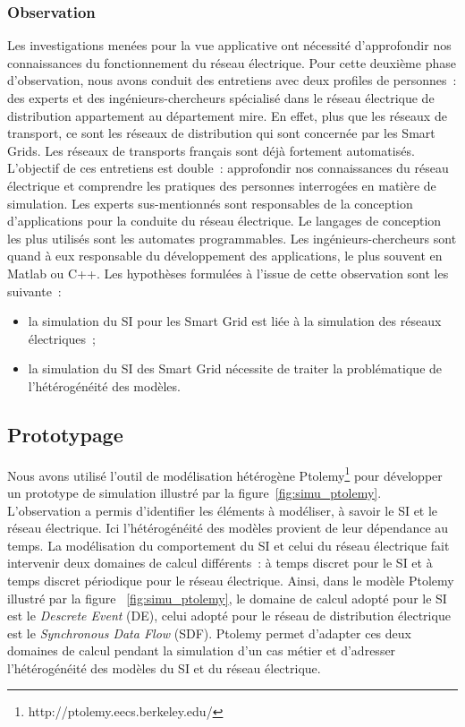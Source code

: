 				\subsubsection{Observation}
				Les investigations menées pour la vue applicative ont nécessité d'approfondir nos connaissances du fonctionnement du réseau électrique. Pour cette deuxième phase d'observation, nous avons conduit des entretiens avec deux profiles de personnes~: des experts et des ingénieurs-chercheurs spécialisé dans le réseau électrique de distribution  appartement au département \gls{mire}. En effet, plus que les réseaux de transport, ce sont les réseaux de distribution qui sont concernée par les Smart Grids. Les réseaux de transports français sont déjà fortement automatisés. 
				L'objectif de ces entretiens est double~: approfondir nos connaissances du réseau électrique et comprendre les pratiques des personnes interrogées en matière de simulation.
				Les experts sus-mentionnés sont responsables de la conception d'applications pour la conduite du réseau électrique. Le langages de conception les plus utilisés sont les automates programmables. Les ingénieurs-chercheurs sont quand à eux responsable du développement des applications, le plus souvent en Matlab ou  C++.
				Les hypothèses formulées à l'issue de cette observation sont les suivante~:
				\begin{itemize}
					\item la simulation du SI pour les Smart Grid est liée à la simulation des réseaux électriques~;
					\item la simulation du SI des Smart Grid nécessite de traiter la problématique de l'hétérogénéité des modèles.
				\end{itemize}
				
				\subsection{Prototypage}
				
				Nous avons utilisé l'outil de modélisation hétérogène Ptolemy\footnote{http://ptolemy.eecs.berkeley.edu/}  pour développer un prototype de simulation illustré par la figure~\ref{fig:simu_ptolemy}. L'observation a permis d'identifier les éléments à modéliser, à savoir le SI et le réseau électrique. Ici l'hétérogénéité des modèles provient de leur dépendance au temps. La modélisation du comportement du SI et celui du réseau électrique fait intervenir deux domaines de calcul différents~: à temps discret pour le SI et à temps discret périodique pour le réseau électrique. 
				Ainsi, dans le modèle Ptolemy illustré par la figure ~\ref{fig:simu_ptolemy}, le domaine de calcul adopté pour le SI est le \textit{Descrete Event} (DE), celui adopté pour le réseau de distribution électrique est le \textit{Synchronous Data Flow} (SDF). Ptolemy permet d'adapter ces deux domaines de calcul pendant la simulation d'un cas métier et d'adresser l'hétérogénéité des modèles du SI et du réseau électrique. 
				
